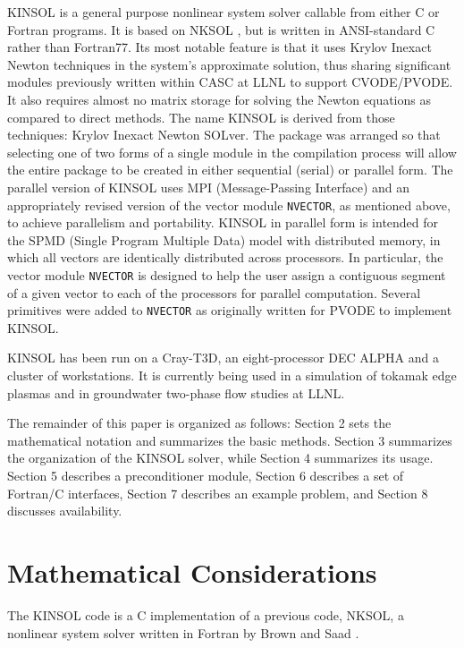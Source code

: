 KINSOL is a general purpose nonlinear system solver callable from either
C or Fortran programs. It is based on NKSOL \cite{BrSa90}, but is written in
ANSI-standard C rather than Fortran77. Its most notable feature is that it
uses Krylov Inexact Newton techniques in the system's approximate solution, 
thus sharing significant modules previously written within CASC at LLNL to 
support CVODE\cite{CoHi94,CoHi96}/PVODE\cite{LDRD98,PVODEusrguide}. It 
also requires almost no matrix storage for solving the Newton equations as 
compared to direct methods. The name \mbox{KINSOL} is derived from those 
techniques: Krylov Inexact Newton SOLver. The package was arranged so that 
selecting one of two forms of a single module in the compilation process will
allow the entire package to be created in either sequential (serial) or 
parallel form. The parallel version of KINSOL uses MPI (Message-Passing 
Interface) \cite{MPI} and an appropriately revised version of the vector module
{\tt NVECTOR}, as mentioned above, to achieve parallelism and portability. 
KINSOL in parallel form is intended for the SPMD (Single Program Multiple Data)
model with distributed memory, in which all vectors are identically distributed
across processors. In particular, the vector module {\tt NVECTOR} is designed 
to help the user assign a contiguous segment of a given vector to each of the 
processors for parallel computation. Several primitives were added to 
{\tt NVECTOR} as originally written for PVODE to implement KINSOL.

KINSOL has been run on a Cray-T3D, an eight-processor DEC ALPHA
and a cluster of workstations.  It is currently being used in a simulation
of tokamak edge plasmas and in groundwater two-phase flow studies at LLNL. 

The remainder of this paper is organized as follows: Section 2 sets
the mathematical notation and summarizes the basic methods. Section 3
summarizes the organization of the KINSOL solver, while Section 4
summarizes its usage.  Section 5 describes a preconditioner module,
Section 6 describes a set of Fortran/C interfaces, Section 7
describes an example problem, and Section 8 discusses availability.


\section{Mathematical Considerations}

The KINSOL code is a C implementation of a previous code, NKSOL, a nonlinear 
system solver written in Fortran by Brown and Saad \cite{BrSa90}.
 

